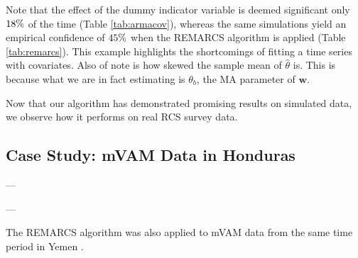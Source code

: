 

Note that the effect of the dummy indicator variable is deemed significant only
 $18\%$ of the time (Table \ref{tab:armacov}), whereas the same simulations yield an empirical confidence of $45\%$ when the REMARCS algorithm is applied (Table \ref{tab:remarcs}). This example highlights the shortcomings of fitting a time series with covariates.
  Also of note is how skewed the sample mean of $\hat{\theta}$ is. This is because what we are in fact estimating is 
  $\theta_b$, the MA parameter of $\mathbf{w}$.












Now that our algorithm has demonstrated promising results on simulated data, we observe how it performs on real RCS survey data.

\subsection{Case Study: mVAM Data in Honduras}

---

---


The REMARCS algorithm was also applied to mVAM data from the same time period in Yemen \cite{Argentino2026review}. 



